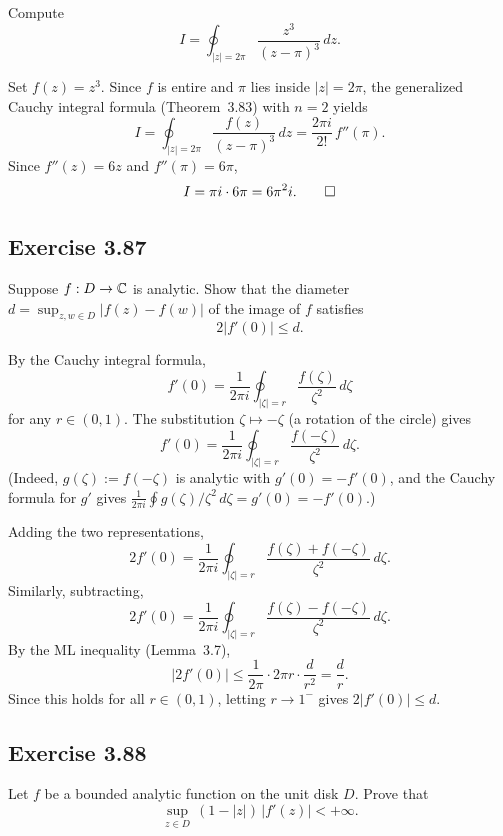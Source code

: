 \documentclass{article}
\begin{document}
Compute
\[
  I = \oint_{|z|=2\pi} \frac{z^3}{(z-\pi)^3}\,dz.
\]

\begin{solution}
  Set $f(z) = z^3$.  Since $f$ is entire and $\pi$ lies inside
  $|z|=2\pi$, the generalized Cauchy integral formula
  (Theorem~3.83) with $n=2$ yields
  \[
    I = \oint_{|z|=2\pi}\frac{f(z)}{(z-\pi)^3}\,dz
    = \frac{2\pi i}{2!}\,f''(\pi).
  \]
  Since $f''(z) = 6z$ and $f''(\pi) = 6\pi$,
  \[
    I = \pi i \cdot 6\pi = 6\pi^2 i.\qedhere
  \]
\end{solution}

\subsection{Exercise 3.87}
\label{sec:ca-ex-3-87}

Suppose $f : D \to \mathbb{C}$ is analytic. Show that the diameter
$d = \sup_{z,w \in D} |f(z) - f(w)|$ of the image of $f$ satisfies
\[
  2|f'(0)| \le d.
\]

\begin{solution}
  By the Cauchy integral formula,
  \[
    f'(0) = \frac{1}{2\pi i}\oint_{|\zeta|=r}
    \frac{f(\zeta)}{\zeta^2}\,d\zeta
  \]
  for any $r \in (0,1)$.
  The substitution $\zeta \mapsto -\zeta$ (a rotation of the
  circle) gives
  \[
    f'(0) = \frac{1}{2\pi i}\oint_{|\zeta|=r}
    \frac{f(-\zeta)}{\zeta^2}\,d\zeta.
  \]
  (Indeed, $g(\zeta) := f(-\zeta)$ is analytic with
  $g'(0) = -f'(0)$, and the Cauchy formula for $g'$ gives
  $\frac{1}{2\pi i}\oint g(\zeta)/\zeta^2\,d\zeta = g'(0) = -f'(0)$.)

  Adding the two representations,
  \[
    2f'(0) = \frac{1}{2\pi i}\oint_{|\zeta|=r}
    \frac{f(\zeta)+f(-\zeta)}{\zeta^2}\,d\zeta.
  \]
  Similarly, subtracting,
  \[
    2f'(0) = \frac{1}{2\pi i}\oint_{|\zeta|=r}
    \frac{f(\zeta)-f(-\zeta)}{\zeta^2}\,d\zeta.
  \]
  By the ML inequality (Lemma~3.7),
  \[
    |2f'(0)|
    \le \frac{1}{2\pi}\cdot 2\pi r\cdot\frac{d}{r^2}
    = \frac{d}{r}.
  \]
  Since this holds for all $r \in (0,1)$, letting
  $r \to 1^-$ gives $2|f'(0)| \le d$.\qedhere
\end{solution}

\subsection{Exercise 3.88}

Let $f$ be a bounded analytic function on the unit disk $D$.
Prove that
\[
  \sup_{z \in D}\,(1 - |z|)\,|f'(z)| < +\infty.
\]
\end{document}
